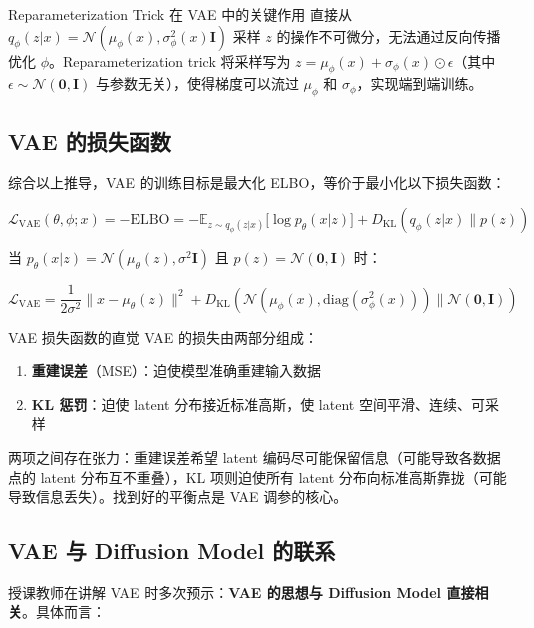 \documentclass[a4paper]{article}
\begin{document}
\begin{knowledgebox}{Reparameterization Trick 在 VAE 中的关键作用}
直接从 $q_\phi(z|x) = \mathcal{N}(\mu_\phi(x), \sigma^2_\phi(x) \mathbf{I})$ 采样 $z$ 的操作不可微分，无法通过反向传播优化 $\phi$。Reparameterization trick 将采样写为 $z = \mu_\phi(x) + \sigma_\phi(x) \odot \epsilon$（其中 $\epsilon \sim \mathcal{N}(\mathbf{0}, \mathbf{I})$ 与参数无关），使得梯度可以流过 $\mu_\phi$ 和 $\sigma_\phi$，实现端到端训练。
\end{knowledgebox}

\subsection{VAE 的损失函数}

综合以上推导，VAE 的训练目标是最大化 ELBO，等价于最小化以下损失函数：

$$\mathcal{L}_{\text{VAE}}(\theta, \phi; x) = -\text{ELBO} = -\mathbb{E}_{z \sim q_\phi(z|x)}{[}\log p_\theta(x|z){]} + D_{\mathrm{KL}}(q_\phi(z|x) \| p(z))$$

当 $p_\theta(x|z) = \mathcal{N}(\mu_\theta(z), \sigma^2 \mathbf{I})$ 且 $p(z) = \mathcal{N}(\mathbf{0}, \mathbf{I})$ 时：

$$\mathcal{L}_{\text{VAE}} = \frac{1}{2\sigma^2}\|x - \mu_\theta(z)\|^2 + D_{\mathrm{KL}}(\mathcal{N}(\mu_\phi(x), \text{diag}(\sigma^2_\phi(x))) \| \mathcal{N}(\mathbf{0}, \mathbf{I}))$$

\begin{importantbox}{VAE 损失函数的直觉}
VAE 的损失由两部分组成：
\begin{enumerate}
    \item \textbf{重建误差}（MSE）：迫使模型准确重建输入数据
    \item \textbf{KL 惩罚}：迫使 latent 分布接近标准高斯，使 latent 空间平滑、连续、可采样
\end{enumerate}
两项之间存在张力：重建误差希望 latent 编码尽可能保留信息（可能导致各数据点的 latent 分布互不重叠），KL 项则迫使所有 latent 分布向标准高斯靠拢（可能导致信息丢失）。找到好的平衡点是 VAE 调参的核心。
\end{importantbox}

\subsection{VAE 与 Diffusion Model 的联系}

授课教师在讲解 VAE 时多次预示：\textbf{VAE 的思想与 Diffusion Model 直接相关}。具体而言：
\end{document}
